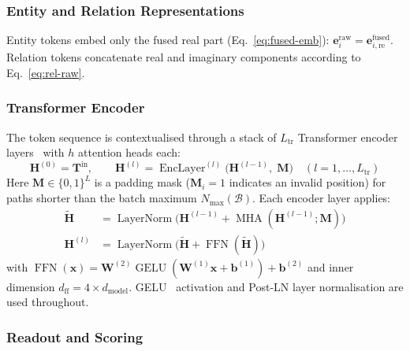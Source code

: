 \vspace{-1em}
\subsubsection{Entity and Relation Representations}
\vspace{-1em}
\label{sec:entity-relation-repr}

Entity tokens embed only the fused real part (Eq.~\ref{eq:fused-emb}):
$\mathbf{e}^{\text{raw}}_i = \mathbf{e}^{\text{fused}}_{i,\text{re}}$.
Relation tokens concatenate real and imaginary components according to Eq.~\ref{eq:rel-raw}.

\vspace{-1em}
\subsubsection{Transformer Encoder}
\vspace{-1em}
\label{sec:transformer-encoder}

The token sequence is contextualised through a stack of $L_{\text{tr}}$
Transformer encoder layers~\cite{vaswani2017attention} with $h$ attention heads each:
\begin{equation}
\mathbf{H}^{(0)} = \mathbf{T}^{\text{in}},\qquad
\mathbf{H}^{(l)} = \operatorname{EncLayer}^{(l)}\bigl(\mathbf{H}^{(l-1)},\; \mathbf{M}\bigr)
\quad (l = 1, \ldots, L_{\text{tr}})
\label{eq:transformer}
\end{equation}
Here $\mathbf{M} \in \{0, 1\}^{L}$ is a padding mask ($\mathbf{M}_i = 1$ indicates an
invalid position) for paths shorter than the batch maximum $N_{\max}(\mathcal{B})$.
Each encoder layer applies:
\begin{align}
    \tilde{\mathbf{H}} &= \operatorname{LayerNorm}\bigl(
        \mathbf{H}^{(l-1)} + \operatorname{MHA}(\mathbf{H}^{(l-1)}; \mathbf{M})\bigr)
        \label{eq:attn}\\
    \mathbf{H}^{(l)} &= \operatorname{LayerNorm}\bigl(
        \tilde{\mathbf{H}} + \operatorname{FFN}(\tilde{\mathbf{H}})\bigr)
        \label{eq:ffn}
\end{align}
with $\operatorname{FFN}(\mathbf{x}) = \mathbf{W}^{(2)} \operatorname{GELU}(\mathbf{W}^{(1)} \mathbf{x} + \mathbf{b}^{(1)}) + \mathbf{b}^{(2)}$
and inner dimension $d_{\text{ff}} = 4 \times d_{\text{model}}$.  GELU~\cite{hendrycks2016gaussian} activation
and Post-LN layer normalisation are used throughout.

\vspace{-1em}
\subsubsection{Readout and Scoring}
\vspace{-1em}
\label{sec:readout}


